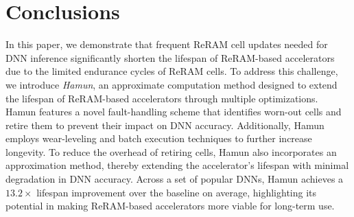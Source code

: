 \section{Conclusions}\label{s:Conclusion}
In this paper, we demonstrate that frequent ReRAM cell updates needed for DNN inference significantly shorten the lifespan of ReRAM-based accelerators due to the limited endurance cycles of ReRAM cells. To address this challenge, we introduce \textit{Hamun}, an approximate computation method designed to extend the lifespan of ReRAM-based accelerators through multiple optimizations. Hamun features a novel fault-handling scheme that identifies worn-out cells and retire them to prevent their impact on DNN accuracy. Additionally, Hamun employs wear-leveling and batch execution techniques to further increase longevity. To reduce the overhead of retiring cells, Hamun also incorporates an approximation method, thereby extending the accelerator’s lifespan with minimal degradation in DNN accuracy. Across a set of popular DNNs, Hamun achieves a $13.2\times$ lifespan improvement over the baseline on average, highlighting its potential in making ReRAM-based accelerators more viable for long-term use.
